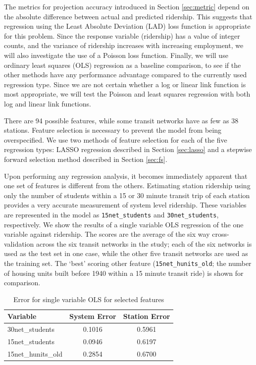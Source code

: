 \documentclass[11pt]{article}
\begin{document}
The metrics for projection accuracy introduced in Section \ref{sec:metric} depend on the absolute difference between actual and predicted ridership. This suggests that regression using the Least Absolute Deviation (LAD) loss function is appropriate for this problem. Since the response variable (ridership) has a value of integer counts, and the variance of ridership increases with increasing employment, we will also investigate the use of a Poisson loss function. Finally, we will use ordinary least squares (OLS) regression as a baseline comparison, to see if the other methods have any performance advantage compared to the currently used regression type. Since we are not certain whether a log or linear link function is most appropriate, we will test the Poisson and least squares regression with both log and linear link functions.

There are 94 possible features, while some transit networks have as few as 38 stations. Feature selection is necessary to prevent the model from being overspecified. We use two methods of feature selection for each of the five regression types: LASSO regression described in Section \ref{sec:lasso} and a stepwise forward selection method described in Section \ref{sec:fs}. 

Upon performing any regression analysis, it becomes immediately apparent that one set of features is different from the others. Estimating station ridership using only the number of students within a 15 or 30 minute transit trip of each station provides a very accurate measurement of system level ridership. These variables are represented in the model as \texttt{15net\_students} and \texttt{30net\_students}, respectively. We show the results of a single variable OLS regression of the one variable against ridership. The scores are the average of the six way cross-validation across the six transit networks in the study; each of the six networks is used as the test set in one case, while the other five transit networks are used as the training set. The `best' scoring other feature (\texttt{15net\_hunits\_old}; the number of housing units built before 1940 within a 15 minute transit ride) is shown for comparison.

\begin{table}[H]
\centering
\begin{tabular}{lcc}
\toprule Variable&System Error&Station Error\\
\midrule 30net\_students&0.1016&0.5961\\
15net\_students&0.0946&0.6197\\
15net\_hunits\_old&0.2854&0.6700\\ 
\end{tabular}
\caption{Error for single variable OLS for selected features}\label{tab:students}
\end{table}
\end{document}
